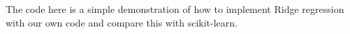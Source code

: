 \documentclass[%
oneside,                 %
final,                   %
10pt]{article}
\begin{document}
The code here is a simple demonstration of how to implement Ridge regression with our own code and compare this with scikit-learn.
\end{document}
